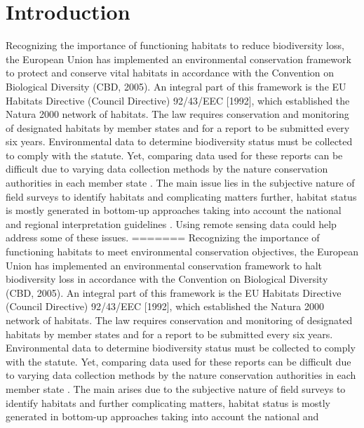 \documentclass[authoryear, review,12pt,number]{elsarticle}
\begin{document}
\section{Introduction}  %
Recognizing the importance of functioning habitats to reduce biodiversity loss, 
the European Union has implemented an environmental conservation framework 
to protect and conserve vital habitats in accordance with the Convention 
on Biological Diversity (CBD, 2005). An integral part of this framework is the 
EU Habitats
Directive (Council Directive) 92/43/EEC [1992], which established the Natura
2000 network of habitats. The law requires conservation and monitoring of
designated habitats by member states and for a report to be submitted every six
years. Environmental data to determine biodiversity status must be collected to
comply with the statute. Yet, comparing data used for these reports can be
difficult due to varying data collection methods by the nature conservation
authorities in each member state \citep{INSPIREdataspecs, INSPIRE}. The main
issue lies in the subjective nature of field surveys to identify habitats
\citep{Cherrill1999, Cherrill1999a, Nieland2015} and complicating
matters further, habitat status is mostly generated in bottom-up approaches
taking into account the national and regional interpretation guidelines
\citep{INSPIREdataspecs}. Using remote sensing data could help address some of
these issues.
=======
Recognizing the importance of functioning habitats to meet environmental
conservation objectives, the European Union has implemented an environmental
conservation framework to halt biodiversity loss in accordance with the
Convention on Biological Diversity (CBD, 2005). An integral part of this
framework is the EU Habitats Directive (Council Directive) 92/43/EEC [1992],
which established the Natura 2000 network of habitats. The law requires
conservation and monitoring of designated habitats by member states and for a
report to be submitted every six years. Environmental data to determine
biodiversity status must be collected to comply with the statute. Yet, comparing
data used for these reports can be difficult due to varying data collection
methods by the nature conservation authorities in each member state
\citep{INSPIREdataspecs, INSPIRE}. The main arises due to the subjective
nature of field surveys to identify habitats \citep{Cherrill1999, Cherrill1999a,
Nieland2015} and further complicating matters, habitat status is
mostly generated in bottom-up approaches taking into account the national and
\end{document}
